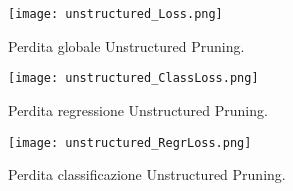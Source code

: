 \begin{figure}
    \centering
    \texttt{[image: unstructured\_Loss.png]}
    \centering
    \caption{Perdita globale Unstructured Pruning.}
    \label{unstr_loss_global_pruning}
\end{figure}
\begin{figure}
    \centering
    \texttt{[image: unstructured\_ClassLoss.png]}
    \centering
    \caption{Perdita regressione Unstructured Pruning.}
    \label{unstr_loss_class_pruning}
\end{figure}
\begin{figure}
    \centering
    \hspace*{-0.5cm}
    \texttt{[image: unstructured\_RegrLoss.png]}
    \centering
    \caption{Perdita classificazione Unstructured Pruning.}
    \label{unstr_loss_regr_pruning}
\end{figure}

